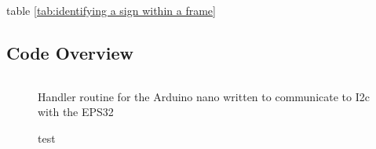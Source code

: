 \documentclass[12pt]{article}
\begin{document}
table \ref{tab:identifying a sign within a frame}


\subsection{Code Overview}
\begin{figure}[ht!]
\inputminted[firstline=12, lastline=50,fontsize=\scriptsize, tabsize=4]{c}{helloworld.c}
   
    \caption{Handler routine for the Arduino nano written to communicate to I2c with the EPS32 }
    \label{fig:i2chandler}
\end{figure}\FloatBarrier

\begin{figure}
    \centering
    
    \caption{test}
    \label{fig:test}
\end{figure}\FloatBarrier




\end{document}
